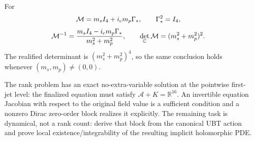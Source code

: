 \documentclass[11pt,a4paper]{article}
\begin{document}
For
\[
 \mathcal M=m_sI_4+i_{\rm c}m_p\Gamma_*,
 \qquad \Gamma_*^2=I_4,
\]
\[
 \mathcal M^{-1}
 =\frac{m_sI_4-i_{\rm c}m_p\Gamma_*}{m_s^2+m_p^2},
 \qquad
 \det_{\mathbb C}\mathcal M=(m_s^2+m_p^2)^2.
\]
The realified determinant is $(m_s^2+m_p^2)^4$, so the same conclusion holds
whenever $(m_s,m_p)\ne(0,0)$.

\begin{tcolorbox}[colback=green!5!white,colframe=green!50!black,title=Exact verdict]
The rank problem has an exact no-extra-variable solution at the pointwise
first-jet level: the finalized equation must satisfy
$\mathcal A+K=\mathbb R^{16}$.  An invertible equation Jacobian with respect
to the original field value is a sufficient condition and a nonzero Dirac
zero-order block realizes it explicitly.  The remaining task is dynamical,
not a rank count: derive that block from the canonical UBT action and prove
local existence/integrability of the resulting implicit holomorphic PDE.
\end{tcolorbox}
\end{document}

